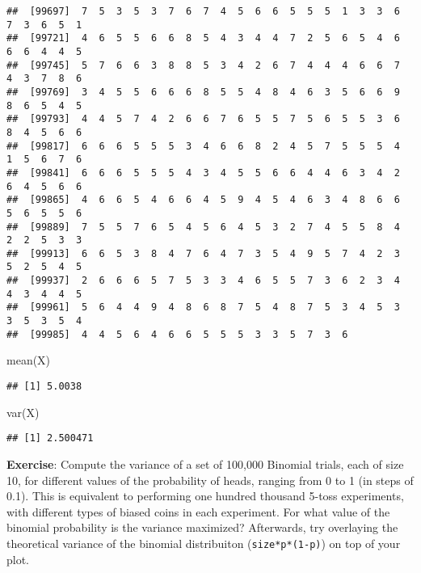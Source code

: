\documentclass[
]{book}
\newenvironment{Shaded}{\begin{snugshade}}{\end{snugshade}}
\newcommand{\FunctionTok}[1]{\textcolor[rgb]{0.00,0.00,0.00}{#1}}
\newcommand{\NormalTok}[1]{#1}
\begin{document}
\begin{verbatim}
##  [99697]  7  5  3  5  3  7  6  7  4  5  6  6  5  5  5  1  3  3  6  7  3  6  5  1
##  [99721]  4  6  5  5  6  6  8  5  4  3  4  4  7  2  5  6  5  4  6  6  6  4  4  5
##  [99745]  5  7  6  6  3  8  8  5  3  4  2  6  7  4  4  4  6  6  7  4  3  7  8  6
##  [99769]  3  4  5  5  6  6  6  8  5  5  4  8  4  6  3  5  6  6  9  8  6  5  4  5
##  [99793]  4  4  5  7  4  2  6  6  7  6  5  5  7  5  6  5  5  3  6  8  4  5  6  6
##  [99817]  6  6  6  5  5  5  3  4  6  6  8  2  4  5  7  5  5  5  4  1  5  6  7  6
##  [99841]  6  6  6  5  5  5  4  3  4  5  5  6  6  4  4  6  3  4  2  6  4  5  6  6
##  [99865]  4  6  6  5  4  6  6  4  5  9  4  5  4  6  3  4  8  6  6  5  6  5  5  6
##  [99889]  7  5  5  7  6  5  4  5  6  4  5  3  2  7  4  5  5  8  4  2  2  5  3  3
##  [99913]  6  6  5  3  8  4  7  6  4  7  3  5  4  9  5  7  4  2  3  5  2  5  4  5
##  [99937]  2  6  6  6  5  7  5  3  3  4  6  5  5  7  3  6  2  3  4  4  3  4  4  5
##  [99961]  5  6  4  4  9  4  8  6  8  7  5  4  8  7  5  3  4  5  3  3  5  3  5  4
##  [99985]  4  4  5  6  4  6  6  5  5  5  3  3  5  7  3  6
\end{verbatim}

\begin{Shaded}
\begin{Highlighting}[]
\FunctionTok{mean}\NormalTok{(X)}
\end{Highlighting}
\end{Shaded}

\begin{verbatim}
## [1] 5.0038
\end{verbatim}

\begin{Shaded}
\begin{Highlighting}[]
\FunctionTok{var}\NormalTok{(X)}
\end{Highlighting}
\end{Shaded}

\begin{verbatim}
## [1] 2.500471
\end{verbatim}

\textbf{Exercise}: Compute the variance of a set of 100,000 Binomial trials, each of size 10, for different values of the probability of heads, ranging from 0 to 1 (in steps of 0.1). This is equivalent to performing one hundred thousand 5-toss experiments, with different types of biased coins in each experiment. For what value of the binomial probability is the variance maximized? Afterwards, try overlaying the theoretical variance of the binomial distribuiton (\texttt{size*p*(1-p)}) on top of your plot.
\end{document}
